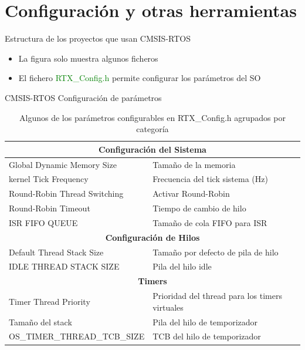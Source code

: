 \section{Configuración y otras herramientas}
\begin{frame}{Estructura de los proyectos que usan CMSIS-RTOS}
\begin{itemize}
    \item La figura solo muestra algunos ficheros 
    \item El fichero \textcolor{green}{RTX\_Config.h} permite configurar los parámetros del SO
\end{itemize}
\end{frame}

\begin{frame}{CMSIS-RTOS Configuración de parámetros}

\begin{table}[H]
\centering
\begin{tabular}{|l|l|}
\hline
\multicolumn{2}{|c|}{\textbf{Configuración del Sistema}} \\
\hline
Global Dynamic Memory Size & Tamaño de la memoria\\
kernel Tick Frequency & Frecuencia del tick sistema (Hz) \\
Round-Robin Thread Switching & Activar Round-Robin \\
Round-Robin Timeout & Tiempo de cambio de hilo \\
ISR FIFO QUEUE & Tamaño de cola FIFO para ISR \\
\hline
\multicolumn{2}{|c|}{\textbf{Configuración de Hilos}} \\
\hline
Default Thread Stack Size & Tamaño por defecto de pila de hilo \\
IDLE THREAD STACK SIZE & Pila del hilo idle \\
\hline
\multicolumn{2}{|c|}{\textbf{Timers}} \\
\hline
Timer Thread Priority & Prioridad del thread para los timers virtuales \\
Tamaño del stack & Pila del hilo de temporizador \\
OS\_TIMER\_THREAD\_TCB\_SIZE & TCB del hilo de temporizador \\
\hline
\end{tabular}
\caption{Algunos de los parámetros configurables en RTX\_Config.h agrupados por categoría}
\end{table}

    
\end{frame}

